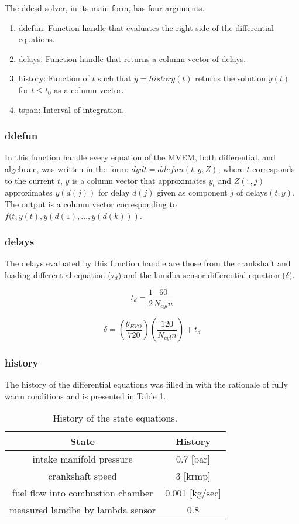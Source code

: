 The ddesd solver, in its main form, has four arguments.
\begin{enumerate}
	\item ddefun: Function handle that evaluates the right side of the differential equations.
	\item delays: Function handle that returns a column vector of delays.
	\item history: Function of $t$ such that $y = history(t)$ returns the solution $y(t)$ for $t \leq t_{0}$ as a column vector. 
	\item tspan: Interval of integration.
\end{enumerate}

\subsubsection{ddefun}
In this function handle every equation of the MVEM, both differential, and algebraic, was written in the form: $dydt= ddefun(t,y,Z)$, where $t$ corresponds to the current $t$, $y$ is a column vector that approximates $y_{t}$ and $Z(:,j)$ approximates $y(d(j))$ for delay $d(j)$ given as component $j$ of delays$(t,y)$. The output is a column vector corresponding to $f(t,y(t),y(d(1),...,y(d(k)))$.

\subsubsection{delays}
The delays evaluated by this function handle are those from the crankshaft and loading differential equation ($\tau _{d}$) and the lamdba sensor differential equation ($\delta $).

$$t_{d}=\displaystyle\frac{1}{2} \displaystyle\frac{60}{N_{cyl}n}$$

$$\delta=(\frac{\theta _{EVO}}{720})(\frac{120}{N_{cyl}n})+t_{d}$$

\subsubsection{history}

The history of the differential equations was filled in with the rationale of fully warm conditions and is presented in Table \ref{table:history}.


\begin{table}[H]
	\centering
	\vspace*{-1ex}
	\scriptsize
	\vspace{-1ex}
	\caption{History of the state equations.}
	\begin{tabular}{|c|c|}
        \hline
        \textbf{State}             & \textbf{History}\\ \hline 
        intake manifold pressure       & 0.7 [bar]\\
        crankshaft speed          & 3 [krmp]\\
        fuel flow into combustion chamber       &0.001 [kg/sec]\\
        measured lamdba by lambda sensor           & 0.8\\
        \hline
    \end{tabular}
    \label{table:history}
\end{table}



